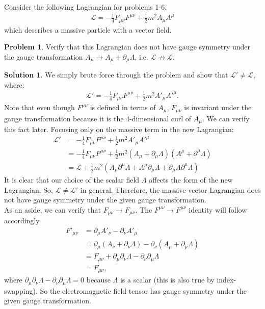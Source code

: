 \documentclass[a4paper,11pt]{article}
\numberwithin{equation}{section}
\theoremstyle{definition}
\newtheorem{prob}{Problem}[section]
\newtheorem{sln}{Solution}[section]
\newcommand{\p}{\partial}
\newcommand{\lag}{\mathcal{L}}
\begin{document}
Consider the following Lagrangian for problems 1-6. 
\begin{align}
\lag = -\frac{1}{4}F_{\mu\nu}F^{\mu\nu} + \frac{1}{2}m^2 A_\mu A^\mu
\end{align}
which describes a massive particle with a vector field.\\
\begin{prob}
	Verify that this Lagrangian does not have gauge symmetry under the gauge transformation $A_\mu \to A_\mu +\p_\mu \Lambda$, i.e. $\lag \not\to \lag$.\\
	\begin{sln}
		We simply brute force through the problem and show that $\lag' \neq \lag$, where:
		\begin{align}
		\lag' = -\frac{1}{4}F_{\mu\nu}F^{\mu\nu} + \frac{1}{2}m^2 A'_\mu A'^\mu.
		\end{align}
		Note that even though $F^{\mu\nu}$ is defined in terms of $A_\mu$, $F_{\mu\nu}$ is invariant under the gauge transformation because it is the 4-dimensional curl of $A_\mu$. We can verify this fact later. Focusing only on the massive term in the new Lagrangian:
		\begin{align}
		\lag' &= -\frac{1}{4}F_{\mu\nu}F^{\mu\nu} + \frac{1}{2}m^2 A'_\mu A'^\mu\\
		&= -\frac{1}{4}F_{\mu\nu}F^{\mu\nu} +\frac{1}{2}m^2(A_\mu + \p_\mu \Lambda)(A^\mu + \p^\mu \Lambda)\\
		&= \lag + \frac{1}{2}m^2(A_\mu \p^\mu\Lambda + A^\mu \p_\mu \Lambda + \p_\mu\Lambda \p^\mu \Lambda)
		\end{align}
		It is clear that our choice of the scalar field $\Lambda$ affects the form of the new Lagrangian. So, $\lag \neq \lag'$ in general. Therefore, the massive vector Lagrangian does not have gauge symmetry under the given gauge transformation.\\
		
		As an aside, we can verify that $F_{\mu\nu}\to F_{\mu\nu}$. The $F^{\mu\nu} \to F^{\mu\nu}$ identity will follow accordingly. 
		\begin{align}
		F'_{\mu\nu} &= \p_\mu A'_\nu - \p_\nu A'_\mu\\
		&= \p_\mu(A_\nu + \p_\nu\Lambda) - \p_\nu(A_\mu + \p_\mu\Lambda)\\
		&= F_{\mu\nu} + \p_\mu \p_\nu \Lambda - \p_\nu \p_\mu\Lambda\\
		&= F_{\mu\nu},
		\end{align}
		where $\p_\mu \p_\nu \Lambda - \p_\nu \p_\mu\Lambda=0$ because $\Lambda$ is a scalar (this is also true by index-swapping). So the electromagnetic field tensor has gauge symmetry under the given gauge transformation. \\
	\end{sln}
\end{prob}
\end{document}
